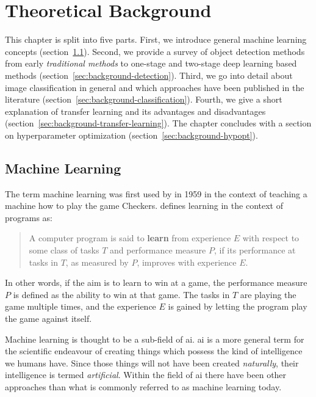 \documentclass[draft,final]{vutinfth} %
\begin{document}
\chapter{Theoretical Background}
\label{chap:background}

This chapter is split into five parts. First, we introduce general
machine learning concepts (section~\ref{sec:theory-ml}). Second, we
provide a survey of object detection methods from early
\emph{traditional methods} to one-stage and two-stage deep learning
based methods (section~\ref{sec:background-detection}). Third, we go
into detail about image classification in general and which approaches
have been published in the literature
(section~\ref{sec:background-classification}). Fourth, we give a short
explanation of transfer learning and its advantages and disadvantages
(section~\ref{sec:background-transfer-learning}). The chapter
concludes with a section on hyperparameter optimization
(section~\ref{sec:background-hypopt}).

\section{Machine Learning}
\label{sec:theory-ml}

The term machine learning was first used by \textcite{samuel1959} in
1959 in the context of teaching a machine how to play the game
Checkers. \textcite{mitchell1997a} defines learning in the context of
programs as:
\begin{quote}
  A computer program is said to \textbf{learn} from experience $E$
  with respect to some class of tasks $T$ and performance measure $P$,
  if its performance at tasks in $T$, as measured by $P$, improves
  with experience $E$. \cite[p.2]{mitchell1997a}
\end{quote}
In other words, if the aim is to learn to win at a game, the
performance measure $P$ is defined as the ability to win at that
game. The tasks in $T$ are playing the game multiple times, and the
experience $E$ is gained by letting the program play the game against
itself.

Machine learning is thought to be a sub-field of \gls{ai}. \gls{ai} is
a more general term for the scientific endeavour of creating things
which possess the kind of intelligence we humans have. Since those
things will not have been created \emph{naturally}, their intelligence
is termed \emph{artificial}. Within the field of \gls{ai} there have
been other approaches than what is commonly referred to as machine
learning today.
\end{document}

